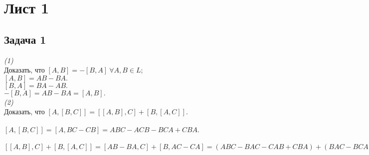 

	\section{Лист 1} 
	\subsection{Задача 1} 
	\textit{(1)}\\
	Доказать, что $[A, B] = -[B, A]\  \forall A,B \in L;$\\
	$[A, B] = AB - BA.$\\
	$[B, A] = BA - AB.$\\
	$-[B, A] = AB - BA = [A, B].$\\
	\textit{(2)}\\
	Доказать, что $[A, [B, C]] = [[A, B], C] + [B, [A, C]]$.\\\\
	$[A, [B, C]] = [A, BC - CB] = ABC - ACB - BCA + CBA.$\\\\
	$[[A, B], C] + [B, [A, C]] = [AB - BA, C] + [B, AC - CA] = (ABC - BAC - CAB + CBA) + (BAC - BCA - ACB + CAB) = ABC + CBA - BCA - ACB = [A, [B, C]].$\\
	
